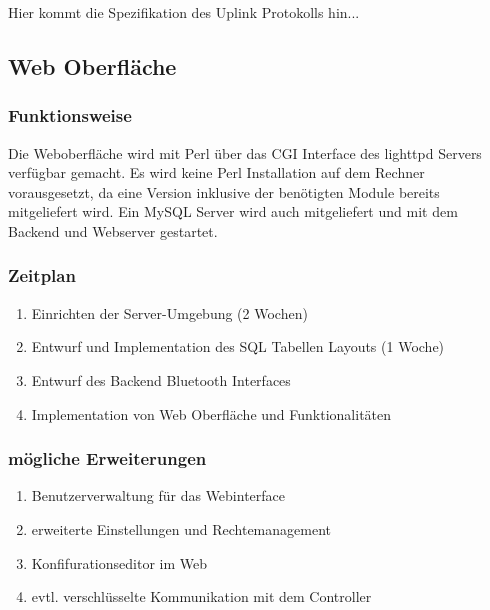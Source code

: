 \documentclass[12pt,a4paper]{article}
\begin{document}
Hier kommt die Spezifikation des Uplink Protokolls hin...

\subsection{Web Oberfläche}

\subsubsection{Funktionsweise}

Die Weboberfläche wird mit Perl über das CGI Interface des lighttpd Servers verfügbar gemacht. Es wird keine Perl Installation auf dem Rechner vorausgesetzt, da eine Version inklusive der benötigten Module bereits mitgeliefert wird. Ein MySQL Server wird auch mitgeliefert und mit dem Backend und Webserver gestartet.


\subsubsection{Zeitplan}

\begin{enumerate}
	\item Einrichten der Server-Umgebung (2 Wochen)
	\item Entwurf und Implementation des SQL Tabellen Layouts (1 Woche)
	\item Entwurf des Backend Bluetooth Interfaces
	\item Implementation von Web Oberfläche und Funktionalitäten
\end{enumerate}

\subsubsection{mögliche Erweiterungen}

\begin{enumerate}
	\item Benutzerverwaltung für das Webinterface
	\item erweiterte Einstellungen und Rechtemanagement
	\item Konfifurationseditor im Web
	\item evtl. verschlüsselte Kommunikation mit dem Controller
\end{enumerate}
\end{document}
